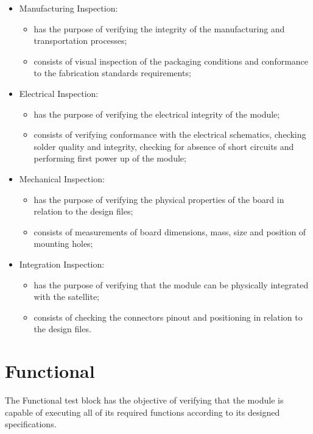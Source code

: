 \begin{itemize}
    \item Manufacturing Inspection:
    \begin{itemize}
        \item has the purpose of verifying the integrity of the manufacturing and transportation processes;
        \item consists of visual inspection of the packaging conditions and conformance to the fabrication standards requirements;
    \end{itemize}

    \item Electrical Inspection:
    \begin{itemize}
        \item has the purpose of verifying the electrical integrity of the module;
        \item consists of verifying conformance with the electrical schematics, checking solder quality and integrity, checking for absence of short circuits and performing first power up of the module;
    \end{itemize}

    \item Mechanical Inspection:
    \begin{itemize}
        \item has the purpose of verifying the physical properties of the board in relation to the design files;
        \item consists of  measurements of board dimensions, mass, size and position of mounting holes;
    \end{itemize}

    \item Integration Inspection:
    \begin{itemize}
        \item has the purpose of verifying that the module can be physically integrated with the satellite;
        \item consists of checking the connectors pinout and positioning in relation to the design files.
    \end{itemize}
\end{itemize}




\section{Functional}

The Functional test block has the objective of verifying that the module is capable of executing all of its required functions according to its designed specifications.

